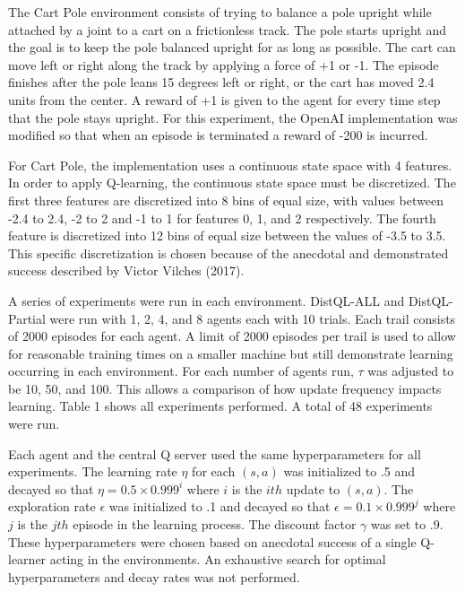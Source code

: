 \documentclass[jair,twoside,11pt,theapa]{article}
\begin{document}
The Cart Pole environment consists of trying to balance a pole upright while attached by a joint to a cart on a frictionless track. The pole starts upright and the goal is to keep the pole balanced upright for as long as possible. The cart can move left or right along the track by applying a force of +1 or -1. The episode finishes after the pole leans 15 degrees left or right, or the cart has moved 2.4 units from the center. A reward of +1 is given to the agent for every time step that the pole stays upright. For this experiment, the OpenAI implementation was modified so that when an episode is terminated a reward of -200 is incurred. 

For Cart Pole, the implementation uses a continuous state space with 4 features. In order to apply Q-learning, the continuous state space must be discretized. The first three features are discretized into 8 bins of equal size, with values between -2.4 to 2.4, -2 to 2 and -1 to 1 for features 0, 1, and 2 respectively. The fourth feature is discretized into 12 bins of equal size between the values of -3.5 to 3.5. This specific discretization is chosen because of the anecdotal and demonstrated success described by Victor Vilches (2017)\nocite{Victor:github}. 

A series of experiments were run in each environment. DistQL-ALL and DistQL-Partial were run with 1, 2, 4, and 8 agents each with 10 trials. Each trail consists of 2000 episodes for each agent. A limit of 2000 episodes per trail is used to allow for reasonable training times on a smaller machine but still demonstrate learning occurring in each environment. For each number of agents run, $\tau$ was adjusted to be 10, 50, and 100. This allows a comparison of how update frequency impacts learning. Table 1 shows all experiments performed. A total of 48 experiments were run. 

Each agent and the central Q server used the same hyperparameters for all experiments. The learning rate $\eta$ for each $(s,a)$ was initialized to .5 and decayed so that $\eta = 0.5 \times 0.999^i$ where $i$ is the $ith$ update to $(s,a)$. The exploration rate $\epsilon$ was initialized to .1 and decayed so that $\epsilon = 0.1 \times 0.999^j$ where $j$ is the $jth$ episode in the learning process. The discount factor $\gamma$ was set to .9. These hyperparameters were chosen based on anecdotal success of a single Q-learner acting in the environments. An exhaustive search for optimal hyperparameters and decay rates was not performed. 
\end{document}
